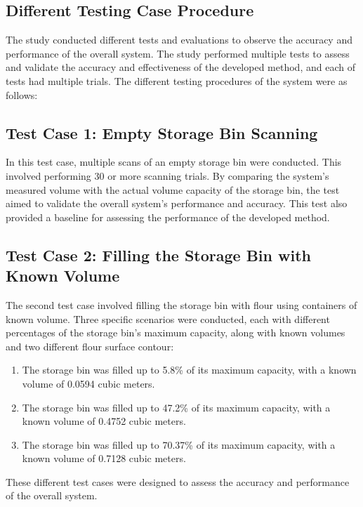 \subsection{Different Testing Case Procedure}
\label{ch3:subsec:Different Testing Procedure}
The study conducted different tests and evaluations to observe the accuracy and performance of the overall system. The study performed multiple tests to assess and validate the accuracy and effectiveness of the developed method, and each of tests had multiple trials. The different testing procedures of the system were as follows:

\subsection*{Test Case 1: Empty Storage Bin Scanning}

In this test case, multiple scans of an empty storage bin were conducted. This involved performing 30 or more scanning trials. By comparing the system's measured volume with the actual volume capacity of the storage bin, the test aimed to validate the overall system's performance and accuracy. This test also provided a baseline for assessing the performance of the developed method.

\subsection*{Test Case 2: Filling the Storage Bin with Known Volume}

The second test case involved filling the storage bin with flour using containers of known volume. Three specific scenarios were conducted, each with different percentages of the storage bin's maximum capacity, along with known volumes and two different flour surface contour:

\begin{enumerate}
	\item The storage bin was filled up to 5.8\% of its maximum capacity, with a known volume of 0.0594 cubic meters.
	\item The storage bin was filled up to 47.2\% of its maximum capacity, with a known volume of 0.4752 cubic meters.
	\item The storage bin was filled up to 70.37\% of its maximum capacity, with a known volume of 0.7128 cubic meters.
\end{enumerate}

These different test cases were designed to assess the accuracy and performance of the overall system.

